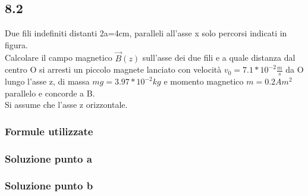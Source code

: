 \documentclass[../../main.tex]{subfiles}
\begin{document}
\subsection*{8.2}
Due fili indefiniti distanti 2a=4cm, paralleli all'asse x solo percorsi indicati in figura.
\\Calcolare il campo magnetico $\vec{B}(z)$ sull'asse dei due fili e a quale distanza dal centro O si arresti un piccolo magnete lanciato con velocità $v_0 = 7.1 * 10^{-2}\frac{m}{s}$ da O lungo l'asse z, di massa $mg = 3.97 * 10^{-2}kg$ e momento magnetico $m=0.2Am^2$ parallelo e concorde a B.
\\Si assume che l'asse z orizzontale.
\subsubsection*{Formule utilizzate}
\subsubsection*{Soluzione punto a}
\subsubsection*{Soluzione punto b}
\newpage
\end{document}

